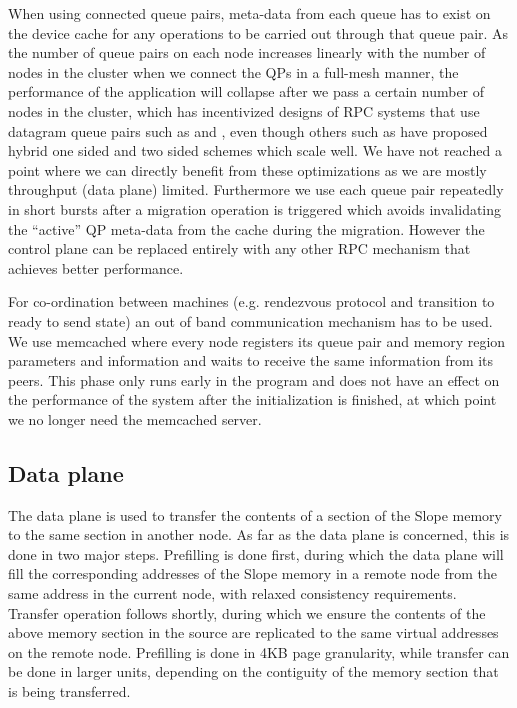 When using connected queue pairs, meta-data
from each queue has to exist on the device cache for any operations to be
carried out through that queue pair. As the number of queue pairs on each node
increases linearly with the number of nodes in the cluster when we connect the
QPs in a full-mesh manner, the performance of the application will collapse
after we pass a certain number of nodes in the cluster, which has
incentivized designs of RPC systems that use datagram queue pairs such as
\cite{kalia2019datacenter} and \cite{kalia2016fasst}, even though others such
as \cite{novakovic2019storm} have proposed hybrid one sided and two sided
schemes which scale well. We have not reached a point where we can directly
benefit from these optimizations as we are mostly throughput (data plane)
limited. Furthermore we use each queue pair repeatedly in short bursts after a
migration operation is triggered which avoids invalidating the ``active'' QP
meta-data from the cache during the migration. However the control plane
can be replaced entirely with any other RPC mechanism that achieves better
performance.

For co-ordination between machines (e.g. rendezvous protocol and transition
to ready to send state)
an out of band communication mechanism has to be used. We use memcached where 
every node registers its queue pair and memory region parameters and
information and waits to receive the same information from its peers. This
phase only runs early in the program and does not have an effect on the
performance of the system after the initialization is finished, at which point
we no longer need the memcached server.

\subsection{Data plane}

The data plane is used to transfer the contents of a section of the Slope
memory to the same section in another node. As far as the data plane is
concerned, this is done in two major steps. Prefilling is done first, during
which the data plane will fill the corresponding addresses of the
Slope memory in a remote node from the same address in the current node, with
relaxed consistency requirements. Transfer operation follows shortly, during
which we ensure the contents of the above memory section in the source are
replicated to the same virtual addresses on the remote node. Prefilling is done
in 4KB page granularity, while transfer can be done in larger units, depending
on the contiguity of the memory section that is being transferred.

